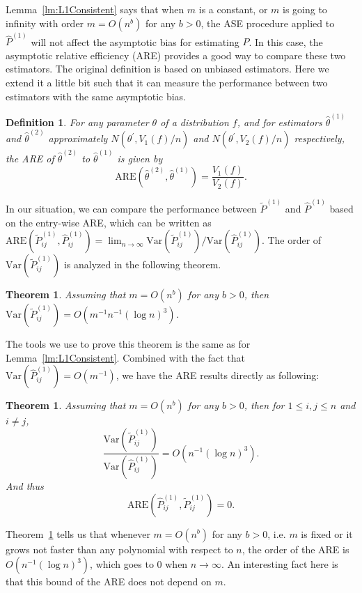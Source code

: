 \documentclass[a4paper]{article}
\newtheorem{theorem}[fact]{Theorem}
\newtheorem{definition}[fact]{Definition}
\renewcommand{\hat}{\widehat}
\begin{document}
Lemma~\ref{lm:L1Consistent} says that when $m$ is a constant, or $m$ is going to infinity with order $m = O(n^b)$ for any $b > 0$, the ASE procedure applied to $\hat{P}^{(1)}$ will not affect the asymptotic bias for estimating $P$.
In this case, the asymptotic relative efficiency (ARE) \citep{serfling2011asymptotic} provides a good way to compare these two estimators. The original definition is based on unbiased estimators. Here we extend it a little bit such that it can measure the performance between two estimators with the same asymptotic bias.

\begin{definition}
For any parameter $\theta$ of a distribution $f$, and for estimators $\hat{\theta}^{(1)}$ and $\hat{\theta}^{(2)}$ approximately $N(\theta^{\prime}, V_1(f)/n)$ and $N(\theta^{\prime}, V_2(f)/n)$ respectively, the ARE of $\hat{\theta}^{(2)}$ to $\hat{\theta}^{(1)}$ is given by
\[
	\mathrm{ARE}(\hat{\theta}^{(2)}, \hat{\theta}^{(1)}) = \frac{V_1(f)}{V_2(f)}.
\]
\end{definition}

In our situation, we can compare the performance between $\widetilde{P}^{(1)}$ and $\hat{P}^{(1)}$ based on the entry-wise ARE, which can be written as $\mathrm{ARE}(\widetilde{P}^{(1)}_{ij}, \hat{P}^{(1)}_{ij}) = \lim_{n \to \infty} \mathrm{Var}(\widetilde{P}_{ij}^{(1)})/\mathrm{Var}(\hat{P}_{ij}^{(1)})$. The order of $\mathrm{Var}(\widetilde{P}_{ij}^{(1)})$ is analyzed in the following theorem.
\begin{theorem}
\label{thm:VarASEL1}
Assuming that $m = O(n^b)$ for any $b > 0$, then $\mathrm{Var}(\widetilde{P}_{ij}^{(1)}) = O(m^{-1} n^{-1} (\log n)^3)$.
\end{theorem}

The tools we use to prove this theorem is the same as for Lemma~\ref{lm:L1Consistent}. Combined with the fact that $\mathrm{Var}(\hat{P}_{ij}^{(1)}) = O(m^{-1})$, we have the ARE results directly as following:
\begin{theorem}
\label{thm:AREL1}
Assuming that $m = O(n^b)$ for any $b > 0$,  then for $1 \le i, j \le n$ and $i \ne j$,
\[
	\frac{\mathrm{Var}(\widetilde{P}_{ij}^{(1)})}{\mathrm{Var}(\hat{P}_{ij}^{(1)})}
    = O(n^{-1} (\log n)^3).
\]
And thus
\[
	\mathrm{ARE}(\hat{P}_{ij}^{(1)}, \widetilde{P}_{ij}^{(1)}) = 0.
\]
\end{theorem}

Theorem~\ref{thm:AREL1} tells us that whenever $m = O(n^b)$ for any $b > 0$, i.e. $m$ is fixed or it grows not faster than any polynomial with respect to $n$, the order of the ARE is $O(n^{-1} (\log n)^3)$, which goes to 0 when $n \to \infty$. An interesting fact here is that this bound of the ARE does not depend on $m$.
\end{document}
